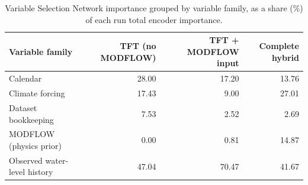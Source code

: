 \begin{table}[htbp]
\centering
\caption{Variable Selection Network importance grouped by variable family, as a share (\%) of each run total encoder importance.}
\label{tab:vsn_families}
\begin{tabular}{lrrr}
\hline
Variable family & TFT (no MODFLOW) & TFT + MODFLOW input & Complete hybrid \\
\hline
Calendar & 28.00 & 17.20 & 13.76 \\
Climate forcing & 17.43 & 9.00 & 27.01 \\
Dataset bookkeeping & 7.53 & 2.52 & 2.69 \\
MODFLOW (physics prior) & 0.00 & 0.81 & 14.87 \\
Observed water-level history & 47.04 & 70.47 & 41.67 \\
\hline
\end{tabular}
\end{table}